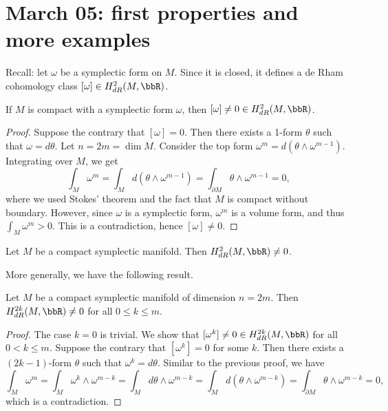 \section{March 05: first properties and more examples}

    Recall: let \(\omega\) be a symplectic form on \(M\). 
    Since it is closed, it defines a de Rham cohomology class \([\omega]\in H^2_{dR}(M,\bbR)\).

    \begin{theorem}
        If \(M\) is compact with a symplectic form \(\omega\), then \([\omega]\neq 0\in H^2_{dR}(M,\bbR)\).
    \end{theorem}
    \begin{proof}
        Suppose the contrary that \([\omega]=0\). 
        Then there exists a 1-form \(\theta\) such that \(\omega=d\theta\). 
        Let \(n = 2m = \dim M\). 
        Consider the top form \(\omega^m = d(\theta\wedge \omega^{m-1})\).
        Integrating over \(M\), we get
        \[ \int_M \omega^m = \int_M d(\theta\wedge \omega^{m-1}) = \int_{\partial M} \theta\wedge \omega^{m-1} = 0, \]
        where we used Stokes' theorem and the fact that \(M\) is compact without boundary.
        However, since \(\omega\) is a symplectic form, \(\omega^m\) is a volume form, and thus \(\int_M \omega^m > 0\).
        This is a contradiction, hence \([\omega]\neq 0\).
    \end{proof}

    \begin{corollary}
        Let \(M\) be a compact symplectic manifold. 
        Then \(H^2_{dR}(M,\bbR)\neq 0\).
    \end{corollary}

    More generally, we have the following result.

    \begin{theorem}
        Let \(M\) be a compact symplectic manifold of dimension \(n = 2m\). 
        Then \(H^{2k}_{dR}(M,\bbR)\neq 0\) for all \(0 \leq k \leq m\).
    \end{theorem}
    \begin{proof}
        The case \(k=0\) is trivial.
        We show that \([\omega^k]\neq 0\in H^{2k}_{dR}(M,\bbR)\) for all \(0 < k \leq m\). 
        Suppose the contrary that \([\omega^k]=0\) for some \(k\). 
        Then there exists a \((2k-1)\)-form \(\theta\) such that \(\omega^k = d\theta\).
        Similar to the previous proof, we have
        \[ \int_M \omega^m = \int_M \omega^k \wedge \omega^{m-k} = \int_M d\theta \wedge \omega^{m-k} = \int_M d(\theta \wedge \omega^{m-k}) = \int_{\partial M} \theta \wedge \omega^{m-k} = 0, \]
        which is a contradiction.
    \end{proof}

